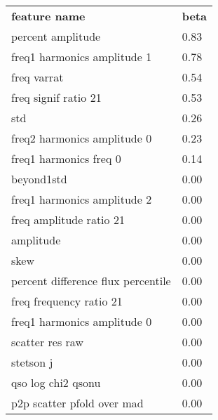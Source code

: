 \begin{center}
\begin{tabular}{ | l | l |}
\hline
\textbf{feature name} & \textbf{beta} \\
percent amplitude & 0.83\\
freq1 harmonics amplitude 1 & 0.78\\
freq varrat & 0.54\\
freq signif ratio 21 & 0.53\\
std & 0.26\\
freq2 harmonics amplitude 0 & 0.23\\
freq1 harmonics freq 0 & 0.14\\
beyond1std & 0.00\\
freq1 harmonics amplitude 2 & 0.00\\
freq amplitude ratio 21 & 0.00\\
amplitude & 0.00\\
skew & 0.00\\
percent difference flux percentile & 0.00\\
freq frequency ratio 21 & 0.00\\
freq1 harmonics amplitude 0 & 0.00\\
scatter res raw & 0.00\\
stetson j & 0.00\\
qso log chi2 qsonu & 0.00\\
p2p scatter pfold over mad & 0.00\\
\hline
\end{tabular}
\end{center}